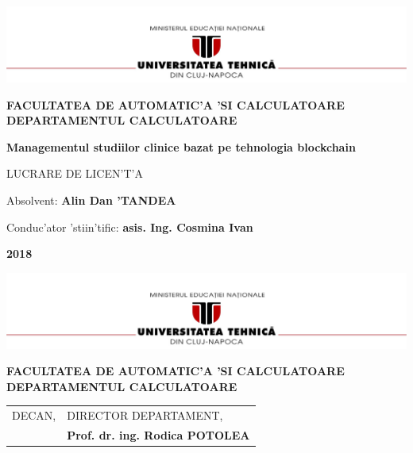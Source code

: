 \documentclass[12pt,a4paper,twoside]{report}
\renewcommand{\thesisauthor}{Alin Dan 'TANDEA}    %
\renewcommand{\thesisyear}{2018}      %
\renewcommand{\thesistitle}{Managementul studiilor clinice bazat pe
tehnologia blockchain} %
\renewcommand{\thesissupervisor}{asis. Ing. Cosmina Ivan}
\newcommand{\department}{FACULTATEA DE AUTOMATIC'A 'SI CALCULATOARE\\
DEPARTAMENTUL CALCULATOARE}
\newcommand{\thesis}{LUCRARE DE LICEN'T'A}
\newcommand{\utcnlogo}{\includegraphics[width=15cm]{img/utcn.jpg}}
\begin{document}

\newenvironment{definition}[1][Defini'tie.]{\begin{trivlist}
\item[\hskip \labelsep {\bfseries #1}]}{\end{trivlist}}




\setcounter{page}{4}



\begin{center}
\utcnlogo

{\bf \department}

\vspace{4cm}

{\bf \thesistitle} %

\vspace{1.5cm}

\thesis

\vspace{6cm}

Absolvent: {\bf \thesisauthor} 

Conduc'ator 'stiin'tific: {\bf \thesissupervisor}

\vspace{3cm}
{\bf \thesisyear}
\end{center}

\thispagestyle{empty}
\newpage

\begin{center}
\utcnlogo

{\bf \department}
\end{center}
\vspace{0.5cm}

\begin{tabular}{p{7cm}p{8cm}}
 \hspace{-1cm}DECAN, & DIRECTOR DEPARTAMENT,\\
\hspace{-1cm}{\bf Prof. dr. ing. Liviu MICLEA} & {\bf Prof. dr. ing. Rodica POTOLEA}\\  
\end{tabular}
 
\end{document}

